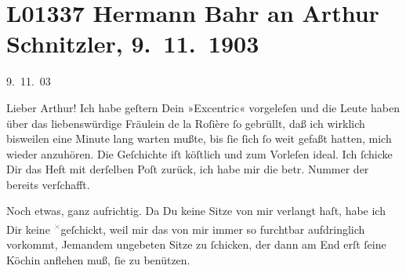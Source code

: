 

\section[Hermann Bahr an Arthur Schnitzler, 9. 11. 1903]{L01337 Hermann Bahr an Arthur Schnitzler, 9. 11. 1903}
\nopagebreak{}
\rehead{ }\normalsize\beginnumbering{}
\toendnotes[C]{\smallbreak\pagebreak[2]}
\toendnotes[C]{\smallbreak}
\pstart
           \raggedleft{}{\pb}9. 11. 03\pend
           
\pstart\center{}Lieber Arthur!\pend\vspace{0.5em}
\pstart
           Ich habe geſtern Dein »Excentric« vorgeleſen und
               die Leute haben über das liebenswürdige Fräulein de la Roſière ſo gebrüllt, daß ich
               wirklich bisweilen eine Minute lang warten mußte, bis ſie ſich ſo weit gefaßt hatten,
               mich wieder anzuhören. Die Geſchichte iſt köſtlich und zum Vorleſen ideal. Ich
               ſchicke Dir das Heft mit derſelben Poſt zurück, ich habe mir die betr. Nummer der
                  \label{K_L01337-1v}\label{K_L01337-1} bereits
               verſchafft.\pend
           
\pstart
           Noch etwas, ganz aufrichtig. Da Du keine Sitze von mir verlangt haſt, habe ich Dir
               keine \substVorne{}\textsuperscript{\textcolor{gray}{×}}\substDazwischen{}g\substHinten{}eſchickt, weil mir das von mir immer so furchtbar aufdringlich vorkommt,
               Jemandem ungebeten Sitze zu ſchicken, der dann am End erſt ſeine Köchin anflehen muß,
               ſie zu benützen.\pend
           
